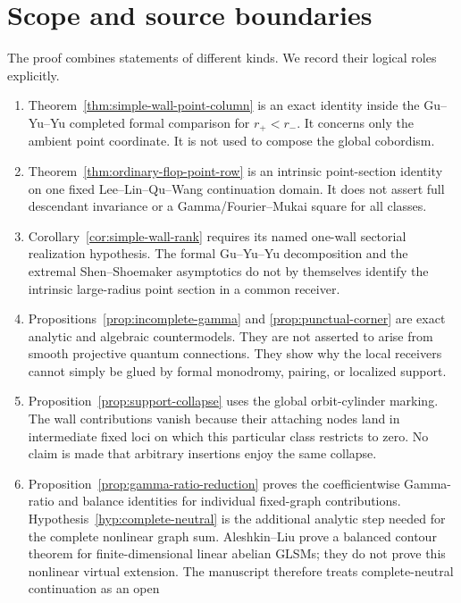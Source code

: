 \section{Scope and source boundaries}
\label{sec:scope}

The proof combines statements of different kinds.  We record their logical
roles explicitly.

\begin{enumerate}[label=\textup{(\arabic*)}]
\item Theorem~\ref{thm:simple-wall-point-column} is an exact identity inside
  the Gu--Yu--Yu completed formal comparison for \(r_+<r_-\).  It concerns
  only the ambient point coordinate.  It is not used to compose the global
  cobordism.
\item Theorem~\ref{thm:ordinary-flop-point-row} is an intrinsic point-section
  identity on one fixed Lee--Lin--Qu--Wang continuation domain.  It does not
  assert full descendant invariance or a Gamma/Fourier--Mukai square for all
  classes.
\item Corollary~\ref{cor:simple-wall-rank} requires its named one-wall
  sectorial realization hypothesis.  The formal Gu--Yu--Yu decomposition and
  the extremal Shen--Shoemaker asymptotics do not by themselves identify the
  intrinsic large-radius point section in a common receiver.
\item Propositions~\ref{prop:incomplete-gamma} and
  \ref{prop:punctual-corner} are exact analytic and algebraic countermodels.
  They are not asserted to arise from smooth projective quantum connections.
  They show why the local receivers cannot simply be glued by formal
  monodromy, pairing, or localized support.
\item Proposition~\ref{prop:support-collapse} uses the global orbit-cylinder
  marking.  The wall contributions vanish because their attaching nodes land
  in intermediate fixed loci on which this particular class restricts to
  zero.  No claim is made that arbitrary insertions enjoy the same collapse.
\item Proposition~\ref{prop:gamma-ratio-reduction} proves the
  coefficientwise Gamma-ratio and balance identities for individual
  fixed-graph contributions.  Hypothesis~\ref{hyp:complete-neutral} is the
  additional analytic step needed for the complete nonlinear graph sum.
  Aleshkin--Liu prove a balanced contour theorem for finite-dimensional
  linear abelian GLSMs; they do not prove this nonlinear virtual extension.
  The manuscript therefore treats complete-neutral continuation as an open

\end{enumerate}
